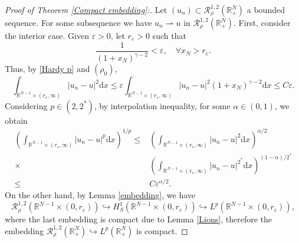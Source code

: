 \documentclass[12pt,reqno]{amsart}
\begin{document}
\begin{proof}[Proof of Theorem \ref{Compact embedding}:] Let $(u_n)\subset \mathcal{R}^{1,2}_{\rho}(\mathds{R}^N_+)$ a bounded sequence. For some subsequence we have $u_n \rightharpoonup u$ in $\mathcal{R}^{1,2}_{\rho}(\mathds{R}^N_+)$. First, consider the interior case. 
Given $\varepsilon>0$, let $r_\varepsilon>0$ such that
\begin{equation*}
    \frac{1}{(1+x_N)^{\gamma-2}}<\varepsilon,\quad \forall x_N>r_\varepsilon.
\end{equation*}
Thus, by \eqref{Hardy p} and $(\rho_0)$,
\begin{equation*}
    \int_{\mathds{R}^{N-1}\times (r_\varepsilon,\infty)}|u_n-u|^2\mathrm{d}x\leq \varepsilon \int_{\mathds{R}^{N-1}\times (r_\varepsilon,\infty)}|u_n-u|^2(1+x_N)^{\gamma-2}\mathrm{d}x\leq C \varepsilon.
\end{equation*}
Considering $p\in(2,2^\ast)$, by interpolation inequality, for some $\alpha\in(0,1)$, we obtain
\begin{align*}
   \left(\int_{\mathds{R}^{N-1}\times (r_\varepsilon,\infty)}|u_n-u|^p\mathrm{d}x \right)^{1/p}\leq& \left(\int_{\mathds{R}^{N-1}\times (r_\varepsilon,\infty)}|u_n-u|^2\mathrm{d}x\right)^{\alpha/2}\\
   \times&\left(\int_{\mathds{R}^{N-1}\times (r_\varepsilon,\infty)}|u_n-u|^{2^\ast}\mathrm{d}x\right)^{(1-\alpha)/2^\ast}\\
   \leq& C\varepsilon^{\alpha/2}.
\end{align*}
On the other hand, by Lemma \ref{embedding}, we have
\begin{equation*}
    \mathcal{R}^{1,2}_\rho(\mathds{R}^{N-1}\times (0,r_\varepsilon))\hookrightarrow H^{1}_S(\mathds{R}^{N-1}\times (0,r_\varepsilon))\hookrightarrow L^p(\mathds{R}^{N-1}\times (0,r_\varepsilon)),
\end{equation*}
where the last embedding is compact due to Lemma \ref{Lions}, therefore the embedding $\mathcal{R}^{1,2}_\rho(\mathds{R}^N_+)\hookrightarrow L^p(\mathds{R}^N_+)$ is compact.


\end{proof}
\end{document}

